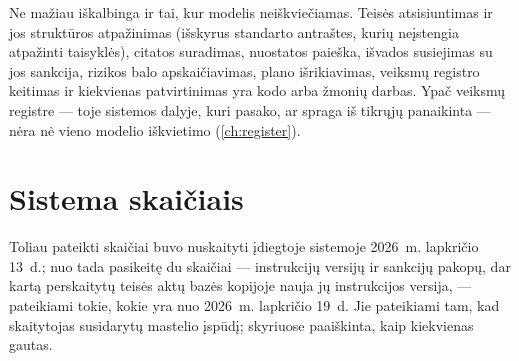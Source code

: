 Ne mažiau iškalbinga ir tai, kur modelis neiškviečiamas. Teisės atsisiuntimas ir jos
struktūros atpažinimas (išskyrus standarto antraštes, kurių neįstengia atpažinti taisyklės), citatos
suradimas, nuostatos paieška, išvados susiejimas su jos sankcija, rizikos balo
apskaičiavimas, plano išrikiavimas, veiksmų registro keitimas ir kiekvienas patvirtinimas yra
kodo arba žmonių darbas. Ypač veiksmų registre --- toje sistemos dalyje, kuri pasako, ar
spraga iš tikrųjų panaikinta --- nėra nė vieno modelio iškvietimo (\cref{ch:register}).

\section{Sistema skaičiais}\label{sec:intro:numbers}

Toliau pateikti skaičiai buvo nuskaityti įdiegtoje sistemoje 2026~m. lapkričio 13~d.; nuo tada
pasikeitę du skaičiai --- instrukcijų versijų ir sankcijų pakopų, dar kartą perskaitytų teisės
aktų bazės kopijoje nauja jų instrukcijos versija, --- pateikiami tokie, kokie yra nuo
2026~m. lapkričio 19~d. Jie pateikiami tam, kad
skaitytojas susidarytų mastelio įspūdį; skyriuose paaiškinta, kaip kiekvienas gautas.

